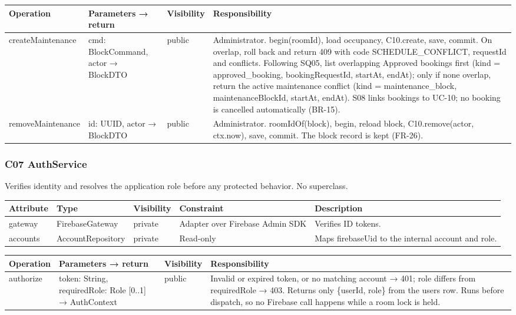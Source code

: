 \small
\setlength{\tabcolsep}{3pt}
\renewcommand{\arraystretch}{1.12}
\begin{longtable}{|p{}|p{}|p{}|p{}|}
\hline
\textbf{Operation} & \textbf{Parameters → return} & \textbf{Visibility} & \textbf{Responsibility} \\ \hline
\endfirsthead \hline
createMaintenance & cmd: BlockCommand, actor → BlockDTO & public & Administrator. begin(roomId), load occupancy, C10.create, save, commit. On overlap, roll back and return 409 with code SCHEDULE\_CONFLICT, requestId and conflicts. Following SQ05, list overlapping Approved bookings first (kind = approved\_booking, bookingRequestId, startAt, endAt); only if none overlap, return the active maintenance conflict (kind = maintenance\_block, maintenanceBlockId, startAt, endAt). S08 links bookings to UC-10; no booking is cancelled automatically (BR-15). \\ \hline
removeMaintenance & id: UUID, actor → BlockDTO & public & Administrator. roomIdOf(block), begin, reload block, C10.remove(actor, ctx.now), save, commit. The block record is kept (FR-26). \\ \hline
\end{longtable}
\normalsize

\subsubsection{C07 AuthService}

Verifies identity and resolves the application role before any protected behavior. No superclass.\par

\small
\setlength{\tabcolsep}{3pt}
\renewcommand{\arraystretch}{1.12}
\begin{longtable}{|p{}|p{}|p{}|p{}|p{}|}
\hline
\textbf{Attribute} & \textbf{Type} & \textbf{Visibility} & \textbf{Constraint} & \textbf{Description} \\ \hline
\endfirsthead \hline
gateway & FirebaseGateway & private & Adapter over Firebase Admin SDK & Verifies ID tokens. \\ \hline
accounts & AccountRepository & private & Read-only & Maps firebaseUid to the internal account and role. \\ \hline
\end{longtable}
\normalsize

\small
\setlength{\tabcolsep}{3pt}
\renewcommand{\arraystretch}{1.12}
\begin{longtable}{|p{}|p{}|p{}|p{}|}
\hline
\textbf{Operation} & \textbf{Parameters → return} & \textbf{Visibility} & \textbf{Responsibility} \\ \hline
\endfirsthead \hline
authorize & token: String, requiredRole: Role [0..1] → AuthContext & public & Invalid or expired token, or no matching account → 401; role differs from requiredRole → 403. Returns only \{userId, role\} from the users row. Runs before dispatch, so no Firebase call happens while a room lock is held. \\ \hline
\end{longtable}
\normalsize

